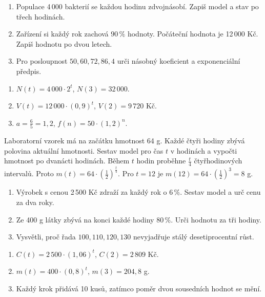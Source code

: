 \documentclass[11pt,a4paper]{article}
\begin{document}
\begin{zadaniReseniBox}[title={Samostatná práce 1}]
\begin{enumerate}[label=\alph*)]
\item Populace 4\,000 bakterií se každou hodinu zdvojnásobí. Zapiš model a stav po třech hodinách.
\item Zařízení si každý rok zachová $90\,\%$ hodnoty. Počáteční hodnota je 12\,000 Kč. Zapiš hodnotu po dvou letech.
\item Pro posloupnost $50,60,72,86{,}4$ urči násobný koeficient a exponenciální předpis.
\end{enumerate}
\tcblower
\begin{enumerate}[label=\alph*)]
\item $N(t)=4\,000\cdot2^t$, $N(3)=32\,000$.
\item $V(t)=12\,000\cdot(0{,}9)^t$, $V(2)=9\,720$ Kč.
\item $a=\frac{6}{5}=1{,}2$, $f(n)=50\cdot(1{,}2)^n$.
\end{enumerate}
\end{zadaniReseniBox}
\begin{zadaniReseniBox}[title={Rozšíření 1}]
Laboratorní vzorek má na začátku hmotnost 64 g. Každé čtyři hodiny zbývá polovina aktuální hmotnosti. Sestav model pro čas $t$ v hodinách a vypočti hmotnost po dvanácti hodinách.
\tcblower
Během $t$ hodin proběhne $\frac{t}{4}$ čtyřhodinových intervalů. Proto $m(t)=64\cdot\left(\frac{1}{2}\right)^{\frac{t}{4}}$. Pro $t=12$ je $m(12)=64\cdot\left(\frac{1}{2}\right)^3=8$ g.
\end{zadaniReseniBox}
\begin{zadaniReseniBox}[title={Domácí úkol}]
\begin{enumerate}[label=\alph*)]
\item Výrobek s cenou 2\,500 Kč zdraží za každý rok o $6\,\%$. Sestav model a urč cenu za dva roky.
\item Ze 400 g látky zbývá na konci každé hodiny $80\,\%$. Urči hodnotu za tři hodiny.
\item Vysvětli, proč řada $100,110,120,130$ nevyjadřuje stálý desetiprocentní růst.
\end{enumerate}
\tcblower
\begin{enumerate}[label=\alph*)]
\item $C(t)=2\,500\cdot(1{,}06)^t$, $C(2)=2\,809$ Kč.
\item $m(t)=400\cdot(0{,}8)^t$, $m(3)=204{,}8$ g.
\item Každý krok přidává 10 kusů, zatímco poměr dvou sousedních hodnot se mění.
\end{enumerate}
\end{zadaniReseniBox}
\end{document}
